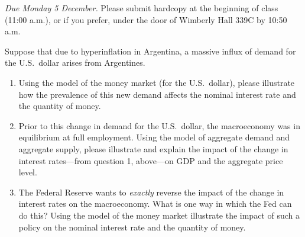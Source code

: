 \documentclass{assignment}
\date{Wednesday 30 November 2022}
\begin{document}
\RaggedRight

\beginassignment{}

\emph{Due Monday 5 December.} Please submit hardcopy at the beginning of class (11:00 a.m.), or if you prefer, under the door of Wimberly Hall 339C by 10:50 a.m.

\ornamentalrule

Suppose that due to hyperinflation in Argentina, a massive influx of demand for the U.S.~dollar arises from Argentines.

\begin{enumerate}

\item Using the model of the money market (for the U.S.~dollar), please illustrate how the prevalence of this new demand affects the nominal interest rate and the quantity of money.

\vspace{2.0\baselineskip}

\begin{center}
\end{center}

\vspace{1.0\baselineskip}

\item Prior to this change in demand for the U.S.~dollar, the macroeconomy was in equilibrium at full employment. Using the model of aggregate demand and aggregate supply, please illustrate and explain the impact of the change in interest rates---from question 1, above---on GDP and the aggregate price level.

\vfill

\begin{center}
\end{center}

\vspace{1.0\baselineskip}

\item The Federal Reserve wants to \emph{exactly} reverse the impact of the change in interest rates on the macroeconomy.  What is one way in which the Fed can do this? Using the model of the money market illustrate the impact of such a policy on the nominal interest rate and the quantity of money.

\vfill

\begin{center}
\end{center}

\end{enumerate}
\end{document}
